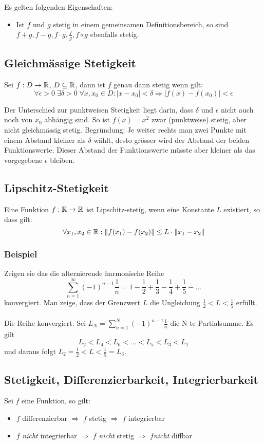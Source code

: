 Es gelten folgenden Eigenschaften:
\begin{itemize}
	\item Ist $f$ und $g$ stetig in einem gemeinsamen Definitionsbereich, so sind
	$f + g, f- g, f \cdot g, \frac{f}{g}, f \circ g$ ebenfalls stetig.
\end{itemize}

\subsection{Gleichmässige Stetigkeit}
Sei $f: D \to \mathbb{R}$, $D \subseteq \mathbb{R}$, dann ist $f$ genau dann stetig wenn gilt:
\[
\forall \epsilon > 0 \; \exists \delta > 0 \; \forall x,x_0 \in D: |x - x_0| < \delta
\Rightarrow |f(x) - f(x_0)| < \epsilon
\]

Der Unterschied zur punktweisen Stetigkeit liegt darin, dass $\delta$ und
$\epsilon$ nicht auch noch von $x_0$ abhängig sind. So ist $f(x) = x^2$ zwar
(punktweise) stetig, aber nicht gleichmässig stetig. Begründung: Je weiter
rechts man zwei Punkte mit einem Abstand kleiner als $\delta$ wählt, desto
grösser wird der Abstand der beiden Funktionswerte. Dieser Abstand der
Funktionswerte müsste aber kleiner als das vorgegebene $\epsilon$ bleiben.

\subsection{Lipschitz-Stetigkeit}
Eine Funktion $f: \mathbb{R} \to \mathbb{R}$ ist Lipschitz-stetig, wenn eine Konstante $L$
existiert, so dass gilt:
\[
\forall x_1,x_2 \in \mathbb{R}: \|f(x_1) - f(x_2)\| \leq L \cdot \|x_1 - x_2\|
\]

\subsubsection*{Beispiel}
Zeigen sie das die alternierende harmonische Reihe \[
\sum_{n=1}^\infty (-1)^{n-1} \frac{1}{n} = 1 - \frac{1}{2} +\frac{1}{3} - \frac{1}{4} + \frac{1}{5} - ...
\]
konvergiert. Man zeige, dass der Grenzwert $L$ die Ungleichung $ \frac{1}{2} < L < \frac{1}{5}$ erfüllt.\\
\\
Die Reihe konvergiert. Sei $L_N = \sum_{n=1}^N (-1)^{n-1} \frac{1}{n}$ die N-te Partialsumme. Es gilt \[
L_2 < L_4 < L_6 < ... < L_5 < L_3 < L_1
\] und daraus folgt $L_2 = \frac{1}{2} < L < \frac{1}{5} = L_3$.


\subsection{Stetigkeit, Differenzierbarkeit, Integrierbarkeit}
Sei $f$ eine Funktion, so gilt:
\begin{itemize}
	\item $f$ differenzierbar $\Rightarrow$ $f$ stetig $\Rightarrow$ $f$ integrierbar
	\item $f$ \emph{nicht} integrierbar $\Rightarrow$ $f$ \emph{nicht} stetig $\Rightarrow$ $f$\emph{nicht} diffbar
\end{itemize}

